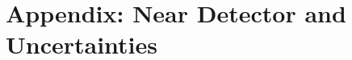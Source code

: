 \section{Appendix: Near Detector and Uncertainties}\label{sec:nu-osc-12}\label{sec:physics-lbnosc-ND-app}
